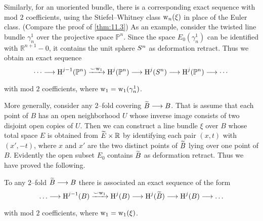 \documentclass[../main]{subfiles}
\begin{document}
Similarly, for an unoriented bundle, there is a corresponding exact sequence with mod $2$ coefficients, using the Stiefel--Whitney class $\operatorname{w}_n(\xi)$ in place of the Euler class. (Compare the proof of \ref{thm:11.3}) As an example, consider the twisted line bundle $\gamma_n^1$ over the projective space ${\mathbb P}^n$. Since the space $E_0(\gamma_n^1)$ can be identified with ${\mathbb R}^{n + 1} - 0$, it contains the unit sphere $S^n$ as deformation retract. Thus we obtain an exact sequence \[\cdots \varrightarrow{} \homology^{j - 1}({\mathbb P}^n) \varrightarrow{\smile \sw_1} \homology^j({\mathbb P}^n) \varrightarrow{} \homology^j(\sphere^n) \varrightarrow{} \homology^j({\mathbb P}^n) \varrightarrow{} \cdots\] with mod $2$ coefficients, where $\operatorname{w}_1 = \operatorname{w}_1(\gamma_n^1)$. 

More generally, consider any $2$--fold covering ${\xtilde B} \longrightarrow B$. That is assume that each point of $B$ has an open neighborhood $U$ whose inverse image consists of two disjoint open copies of $U$. Then we can construct a line bundle $\xi$ over $B$ whose total space $E$ is obtained from ${\xtilde E} \times \mathbb R$ by identifying each pair $(x, t)$ with $(x', -t)$, where $x$ and $x'$ are the two distinct points of ${\xtilde B}$ lying over one point of $B$. Evidently the open subset $E_0$ contains ${\xtilde B}$ as deformation retract. Thus we have proved the following. 

\begin{corollary}\label{cor:12.3}
To any $2$--fold ${\xtilde B} \longrightarrow B$ there is associated an exact sequence of the form \[\ldots \varrightarrow{} \homology^{j - 1}(B) \varrightarrow{\smile \sw_1} \homology^j(B) \varrightarrow{} \homology^j({\xtilde B}) \varrightarrow{} \homology^j(B) \varrightarrow{} \ldots\] with mod $2$ coefficients, where $\operatorname{w}_1 = \operatorname{w}_1(\xi)$. 
\end{corollary}
\end{document}
